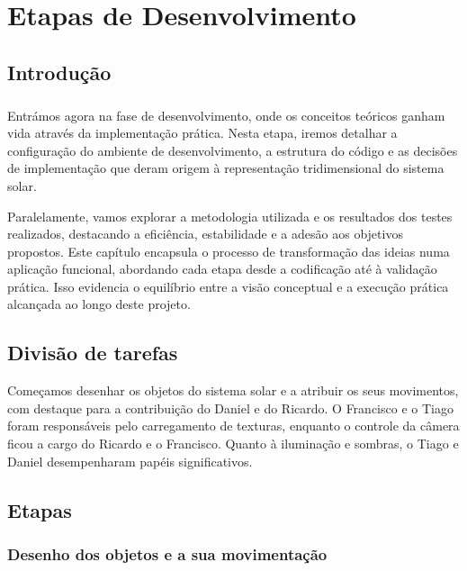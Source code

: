 \documentclass[12pt,a4paper]{memoir}
\begin{document}


\chapter{Etapas de Desenvolvimento}
\label{chap:tecno-ferra}

\section{Introdução}
\label{chap3:sec:intro}
\paragraph{}
Entrámos agora na fase de desenvolvimento, onde os conceitos teóricos ganham vida através da implementação prática. Nesta etapa, iremos detalhar a configuração do ambiente de desenvolvimento, a estrutura do código e as decisões de implementação que deram origem à representação tridimensional do sistema solar.

Paralelamente, vamos explorar a metodologia utilizada e os resultados dos testes realizados, destacando a eficiência, estabilidade e a adesão aos objetivos propostos. Este capítulo encapsula o processo de transformação das ideias numa aplicação funcional, abordando cada etapa desde a codificação até à validação prática. Isso evidencia o equilíbrio entre a visão conceptual e a execução prática alcançada ao longo deste projeto.

\section{Divisão de tarefas}
\label{chap3:sec:desc-organ}
Começamos desenhar os objetos do sistema solar e a atribuir os seus movimentos, com destaque para a contribuição do Daniel e do Ricardo. O Francisco e o Tiago foram responsáveis pelo carregamento de texturas, enquanto o controle da câmera ficou a cargo do Ricardo e o Francisco. Quanto à iluminação e sombras, o Tiago e Daniel desempenharam papéis significativos.

\newpage

\section{Etapas}

\subsection{Desenho dos objetos e a sua movimentação}
\end{document}
